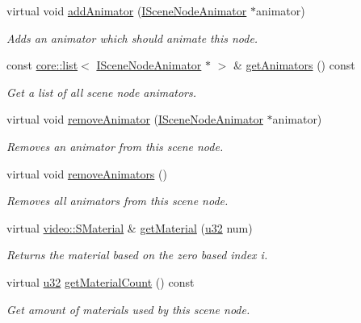 \begin{DoxyCompactItemize}
virtual void \hyperlink{classirr_1_1scene_1_1ISceneNode_a0e5cd342cd7293c136e53e2c2c5e0f3a}{add\+Animator} (\hyperlink{classirr_1_1scene_1_1ISceneNodeAnimator}{I\+Scene\+Node\+Animator} $\ast$animator)
\begin{DoxyCompactList}\small\item\em Adds an animator which should animate this node. \end{DoxyCompactList}\item 
const \hyperlink{classirr_1_1core_1_1list}{core\+::list}$<$ \hyperlink{classirr_1_1scene_1_1ISceneNodeAnimator}{I\+Scene\+Node\+Animator} $\ast$ $>$ \& \hyperlink{classirr_1_1scene_1_1ISceneNode_a454fc115d9afa89623c55deba8a4add1}{get\+Animators} () const
\begin{DoxyCompactList}\small\item\em Get a list of all scene node animators. \end{DoxyCompactList}\item 
virtual void \hyperlink{classirr_1_1scene_1_1ISceneNode_aaa67f8f91d4ec99f82955641f1f9e521}{remove\+Animator} (\hyperlink{classirr_1_1scene_1_1ISceneNodeAnimator}{I\+Scene\+Node\+Animator} $\ast$animator)
\begin{DoxyCompactList}\small\item\em Removes an animator from this scene node. \end{DoxyCompactList}\item 
virtual void \hyperlink{classirr_1_1scene_1_1ISceneNode_a28f198bd566e9a7290cbefa531d8d31e}{remove\+Animators} ()
\begin{DoxyCompactList}\small\item\em Removes all animators from this scene node. \end{DoxyCompactList}\item 
virtual \hyperlink{classirr_1_1video_1_1SMaterial}{video\+::\+S\+Material} \& \hyperlink{classirr_1_1scene_1_1ISceneNode_a1f44d8cf753b2e4c17c90d4fc2ed05b2}{get\+Material} (\hyperlink{namespaceirr_a0416a53257075833e7002efd0a18e804}{u32} num)
\begin{DoxyCompactList}\small\item\em Returns the material based on the zero based index i. \end{DoxyCompactList}\item 
virtual \hyperlink{namespaceirr_a0416a53257075833e7002efd0a18e804}{u32} \hyperlink{classirr_1_1scene_1_1ISceneNode_a8e75e9baede63e31e6aa6e42e6c8ddfe}{get\+Material\+Count} () const
\begin{DoxyCompactList}\small\item\em Get amount of materials used by this scene node. \end{DoxyCompactList}\item 

\end{DoxyCompactItemize}
